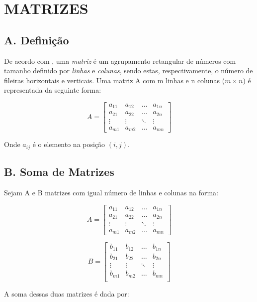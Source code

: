 \documentclass[twocolumn, 10pt]{extarticle}
\begin{document}
\section{MATRIZES}
\subsection*{A. \quad Definição}
De acordo com \cite[p. 26]{antonAlgebra}, uma \textit{matriz} é um agrupamento retangular de números com tamanho definido por \textit{linhas} e \textit{colunas}, sendo estas, respectivamente, o número de fileiras horizontais e verticais.
Uma matriz A com m linhas e n colunas ($m \times n$) é representada da seguinte forma:

\[ 
A = 
\begin{bmatrix}
a_{11} & a_{12} & \dots & a_{1n} \\
a_{21} & a_{22} & \dots & a_{2n} \\
\vdots & \vdots & \ddots & \vdots \\
a_{m1} & a_{m2} & \dots & a_{mn} 

\end{bmatrix}
\]

Onde $a_{ij}$ é o elemento na posição $(i, j)$.


\subsection*{B. \quad Soma de Matrizes}

Sejam A e B matrizes com igual número de linhas e colunas na forma:

\[ 
A = 
\begin{bmatrix}
a_{11} & a_{12} & \dots & a_{1n} \\
a_{21} & a_{22} & \dots & a_{2n} \\
\vdots & \vdots & \ddots & \vdots \\
a_{m1} & a_{m2} & \dots & a_{mn} 

\end{bmatrix}
\]

\[ 
B = 
\begin{bmatrix}
b_{11} & b_{12} & \dots & b_{1n} \\
b_{21} & b_{22} & \dots & b_{2n} \\
\vdots & \vdots & \ddots & \vdots \\
b_{m1} & b_{m2} & \dots & b_{mn}\\
\end{bmatrix}
\]

A soma dessas duas matrizes é dada por:
\end{document}
